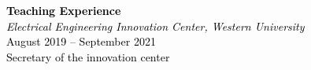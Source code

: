 \documentclass{article}
\begin{document}
\noindent
{}
\begin{minipage}[t]{0.7\textwidth}
    \vspace*{1cm}
    \textcolor{black}{\large\bfseries Teaching Experience} \\
    \textcolor{black}{\small\emph{Electrical Engineering Innovation Center, Western University}} \\
    \textcolor{black}{\small August 2019 -- September 2021} \\
    \textcolor{black}{\small Secretary of the innovation center} \\
\end{minipage}
\end{document}
